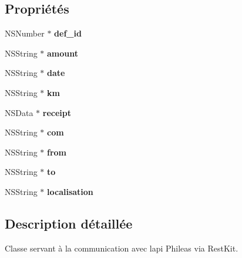 \subsection*{Propriétés}
\begin{DoxyCompactItemize}
\item 
\hypertarget{interface_draft_aa3871069b7236a8239f06637635cc4ef}{}N\+S\+Number $\ast$ {\bfseries def\+\_\+id}\label{interface_draft_aa3871069b7236a8239f06637635cc4ef}

\item 
\hypertarget{interface_draft_ac1c67205ebb1f1167ab8e9cc637206aa}{}N\+S\+String $\ast$ {\bfseries amount}\label{interface_draft_ac1c67205ebb1f1167ab8e9cc637206aa}

\item 
\hypertarget{interface_draft_a1b169e57427dace9437d0028c0c94730}{}N\+S\+String $\ast$ {\bfseries date}\label{interface_draft_a1b169e57427dace9437d0028c0c94730}

\item 
\hypertarget{interface_draft_a6d2a7e09c1cf761d821de5af97572fc4}{}N\+S\+String $\ast$ {\bfseries km}\label{interface_draft_a6d2a7e09c1cf761d821de5af97572fc4}

\item 
\hypertarget{interface_draft_abaa3cd68816062548300b8f1f5d03672}{}N\+S\+Data $\ast$ {\bfseries receipt}\label{interface_draft_abaa3cd68816062548300b8f1f5d03672}

\item 
\hypertarget{interface_draft_a27f34d3de94386d569dcabeba858771d}{}N\+S\+String $\ast$ {\bfseries com}\label{interface_draft_a27f34d3de94386d569dcabeba858771d}

\item 
\hypertarget{interface_draft_a2d29c339c24bc9f7eaae20f154c83e8b}{}N\+S\+String $\ast$ {\bfseries from}\label{interface_draft_a2d29c339c24bc9f7eaae20f154c83e8b}

\item 
\hypertarget{interface_draft_a353f4d641978eee4b152eb949b47f6b8}{}N\+S\+String $\ast$ {\bfseries to}\label{interface_draft_a353f4d641978eee4b152eb949b47f6b8}

\item 
\hypertarget{interface_draft_aec69d55b5e041e672dea49c4bce01a02}{}N\+S\+String $\ast$ {\bfseries localisation}\label{interface_draft_aec69d55b5e041e672dea49c4bce01a02}

\end{DoxyCompactItemize}


\subsection{Description détaillée}
Classe servant à la communication avec l\textquotesingle{}api Phileas via Rest\+Kit. 

